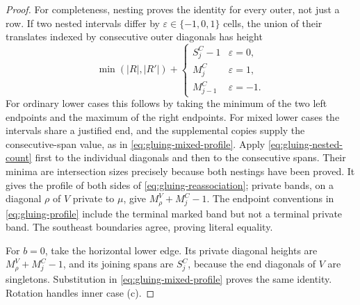 \documentclass[11pt,a4paper]{amsart}
\numberwithin{equation}{section}
\theoremstyle{plain}
\theoremstyle{definition}
\begin{document}
\begin{proof}
For completeness, nesting proves the identity for every outer, not just a row.  If two nested intervals differ by \(\varepsilon\in\{-1,0,1\}\) cells, the union of their translates indexed by consecutive outer diagonals has height
\begin{equation}\label{eq:gluing-nested-count}
 \min(|R|,|R'|)+
 \begin{cases}S^C_j-1&\varepsilon=0,\\M^C_j&\varepsilon=1,\\M^C_{j-1}&\varepsilon=-1.
 \end{cases}
\end{equation}
For ordinary lower cases this follows by taking the minimum of the two left endpoints and the maximum of the right endpoints.  For mixed lower cases the intervals share a justified end, and the supplemental copies supply the consecutive-span value, as in \eqref{eq:gluing-mixed-profile}.  Apply \eqref{eq:gluing-nested-count} first to the individual diagonals and then to the consecutive spans.  Their minima are intersection sizes precisely because both nestings have been proved.  It gives the profile of both sides of \eqref{eq:gluing-reassociation}; private bands, on a diagonal \(\rho\) of \(V\) private to \(\mu\), give \(M^V_\rho+M^C_j-1\).  The endpoint conventions in \eqref{eq:gluing-profile} include the terminal marked band but not a terminal private band.  The southeast boundaries agree, proving literal equality.

For \(b=0\), take the horizontal lower edge.  Its private diagonal heights are \(M^V_\rho+M^C_j-1\), and its joining spans are \(S^C_j\), because the end diagonals of \(V\) are singletons.  Substitution in \eqref{eq:gluing-mixed-profile} proves the same identity.  Rotation handles inner case (c).
\end{proof}
\end{document}
